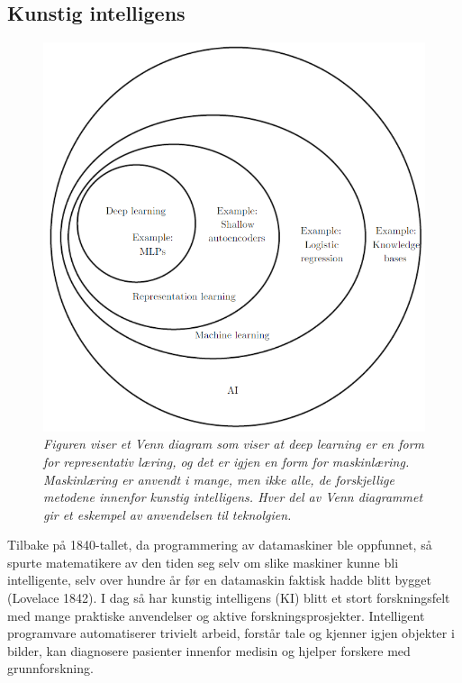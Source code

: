 \subsection{Kunstig intelligens}

\begin{figure} 
\begin{center} 
\includegraphics[scale=0.7]{figures/ai}
\caption{\small \sl Figuren viser et Venn diagram som viser at deep learning er en form for representativ læring, og det er igjen en form for maskinlæring. Maskinlæring er anvendt i mange, men ikke alle, de forskjellige metodene innenfor kunstig intelligens. Hver del av Venn diagrammet gir et eskempel av anvendelsen til teknolgien. \cite{Goodfellow m.fl. 2016 s. 9} \label{fig:ai}} 
\end{center} 
\end{figure} 

Tilbake på 1840-tallet, da programmering av datamaskiner ble oppfunnet, så spurte matematikere av den tiden seg selv om slike maskiner kunne bli intelligente, selv over hundre år før en datamaskin faktisk hadde blitt bygget (Lovelace 1842). I dag så har kunstig intelligens (KI) blitt et stort forskningsfelt med mange praktiske anvendelser og aktive forskningsprosjekter. Intelligent programvare automatiserer trivielt arbeid, forstår tale og kjenner igjen objekter i bilder, kan diagnosere pasienter innenfor medisin og hjelper forskere med grunnforskning. \cite{Goodfellow m.fl. 2016 s. 1}

